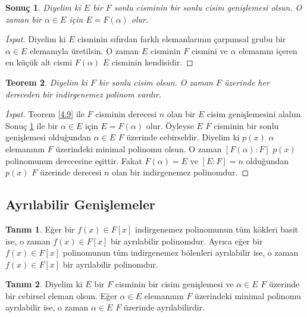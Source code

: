 \documentclass{article}
\newtheorem{thm}{Teorem}[section]
\newtheorem{cor}[thm]{Sonuç}
\theoremstyle{definition}
\newtheorem{defn}{Tanım}[section]
\theoremstyle{remark}
\begin{document}
    	    \begin{cor}\label{4.11}
    	        Diyelim ki $E$ bir $F$ sonlu cisminin bir sonlu cisim genişlemesi olsun. O zaman bir $\alpha \in E$ için $E = F(\alpha)$ olur.
    	    \end{cor}
    	    
    	    \begin{proof}[İspat]
    	        Diyelim ki $E$ cisminin sıfırdan farklı elemanlarının çarpımsal grubu bir $\alpha \in E$ elemanıyla üretilsin. O zaman $E$ cisminin $F$ cismini ve $\alpha$ elemanını içeren en küçük alt cismi $F(\alpha)$ $E$ cisminin kendisidir.
    	    \end{proof}
    	    
    	    \begin{thm}
    	        Diyelim ki $F$ bir sonlu cisim olsun. O zaman $F$ üzerinde her dereceden bir indirgenemez polinom vardır.
    	    \end{thm}
    	    
    	    \begin{proof}[İspat]
    	        Teorem \ref{4.9} ile $F$ cisminin derecesi $n$ olan bir $E$ cisim genişlemesini alalım. Sonuç \ref{4.11} ile bir $\alpha \in E$ için $E = F(\alpha)$ olur. Öyleyse $E$ $F$ cisminin bir sonlu genişlemesi olduğundan $\alpha \in E$ $F$ üzerinde cebirseldir. Diyelim ki $p(x)$ $\alpha$ elemanının $F$ üzerindeki minimal polinomu olsun. O zaman $[F(\alpha) : F]$ $p(x)$ polinomunun derecesine eşittir. Fakat $F(\alpha) = E$ ve $[E : F] = n$ olduğundan $p(x)$ $F$ üzerinde derecesi $n$ olan bir indirgenemez polinomdur.
    	    \end{proof}
	        
    	\subsection{Ayrılabilir Genişlemeler}
    	
    	    \begin{defn}
    	        Eğer bir $f(x) \in F[x]$ indirgenemez polinomunun tüm kökleri basit ise, o zaman $f(x) \in F[x]$ bir ayrılabilir polinomdur. Ayrıca eğer bir $f(x) \in F[x]$ polinomunun tüm indirgenemez bölenleri ayrılabilir ise, o zaman $f(x) \in F[x]$ bir ayrılabilir polinomdur.
    	    \end{defn}
    	    
    	    \begin{defn}
    	        Diyelim ki $E$ bir $F$ cisminin bir cisim genişlemesi ve $\alpha \in E$ $F$ üzerinde bir cebirsel eleman olsun. Eğer $\alpha \in E$ elemanının $F$ üzerindeki minimal polinomu ayrılabilir ise, o zaman $\alpha \in E$ $F$ üzerinde ayrılabilirdir.
    	    \end{defn}
    	    
\end{document}
